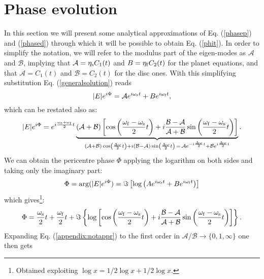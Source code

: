 \documentclass[usenatbib,a4paper,times,fleqn]{mnras}
\begin{document}
\section{Phase evolution}\label{phasevo}
In this section we will present some analytical approximations of Eq. (\ref{phasep}) and (\ref{phased}) through which it will be possible to obtain Eq. (\ref{phit}). In order to simplify the notation, we will refer to the modulus part of the eigen-modes as $\mathcal A$ and $\mathcal B$, implying that $\mathcal{A}=\eta_{\rm s}C_1(t)$ and $B=\eta_{\rm f}C_2(t)$ for the planet equations, and that $\mathcal A=C_1(t)$ and $\mathcal B=C_2(t)$ for the disc ones. With this simplifying substitution Eq. (\ref{generalsolution}) reads
\begin{equation}
|E|e^{i\Phi }=\mathcal Ae^{i\omega_{\rm s}t}+Be^{i\omega_{\rm f}t},
\end{equation}
which can be restated also as:
\begin{equation}
|E|e^{i\Phi }=e^{i\frac{\omega_{\rm s}+\omega_{\rm f}}{2}t}\underbrace{(\mathcal A+ \mathcal B)\left[\cos\left(\frac{\omega_{\rm f}-\omega_{\rm s}}{2}t\right)+i\frac{\mathcal B-\mathcal{A}}{\mathcal{A}+\mathcal B}\sin\left(\frac{\omega_{\rm f}-\omega_{\rm s}}{2}t\right)\right]}_{(\mathcal{A}+\mathcal B)\cos\left(\frac{\Delta\omega}{2}t\right)+i(\mathcal B-\mathcal{A})\sin\left(\frac{\Delta\omega}{2}t\right)\,=\,\mathcal{A}e^{-i\frac{\Delta\omega}{2}t}+\mathcal B e^{i\frac{\Delta\omega}{2}t}}.
\end{equation}
We can obtain the pericentre phase $\Phi $ applying the logarithm on both sides and taking only the imaginary part:
\begin{equation}
\Phi =\arg(|E|e^{i\Phi})=\Im\left[\log\left(Ae^{i\omega_{\rm s}t}+Be^{i\omega_{\rm f}t}\right)\right]
\end{equation}
which gives\footnote{Obtained exploiting $\log x=1/2\log x +1/2\log x$.}:
\begin{equation}
\Phi  = \frac{\omega_{\rm s}}{2}t+\frac{\omega_{\rm f}}{2}t+\Im\left\{\log\left[\cos\left(\frac{\omega_{\rm f}-\omega_{\rm s}}{2}t\right)+i\frac{\mathcal B-\mathcal A}{\mathcal A+\mathcal B}\sin\left(\frac{\omega_{\rm f}-\omega_{\rm s}}{2}t\right)\right]\right\}.\label{appendix:notappr}
\end{equation}
Expanding Eq. (\ref{appendix:notappr}) to the first order in $\mathcal A/\mathcal B\rightarrow \{0,1,\infty\}$ one then gets
\end{document}
